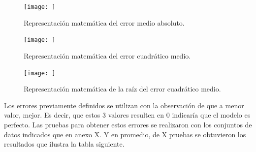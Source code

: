 {\begin{figure}[H]
    \centering
    \texttt{[image: ]}
    \caption{Representación matemática del error medio absoluto.}
    \label{ecuaciones}
\end{figure}

\begin{figure}[H]
    \centering
    \texttt{[image: ]}
    \caption{Representación matemática del error cuadrático medio.}
    \label{ecuaciones}
\end{figure}

\begin{figure}[H]
    \centering
    \texttt{[image: ]}
    \caption{Representación matemática de la raíz del error cuadrático medio.}
    \label{ecuaciones}
\end{figure}

\noindent Los errores previamente definidos se utilizan con la observación de que a menor valor, mejor. Es decir, que estos 3 valores resulten en 0 indicaría que el modelo es perfecto. Las pruebas para obtener estos errores se realizaron con los conjuntos de datos indicados que en anexo X. Y en promedio, de X pruebas se obtuvieron los resultados que ilustra la tabla siguiente.



}
